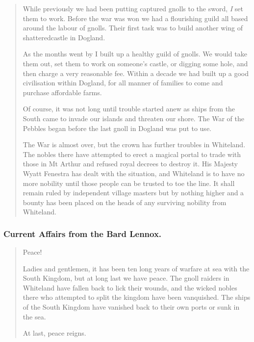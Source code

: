 \begin{multicols}{2}
\begin{quotation}
	While previously we had been putting captured gnolls to the sword, \emph{I} set them to work.
	Before the war was won we had a flourishing guild all based around the labour of gnolls.
	Their first task was to build another wing of \gls{shatteredcastle} in Dogland.

	As the months went by I built up a healthy guild of gnolls.
	We would take them out, set them to work on someone's castle, or digging some hole, and then charge a very reasonable fee.
	Within a decade we had built up a good civilisation within Dogland, for all manner of families to come and purchase affordable farms.

	Of course, it was not long until trouble started anew as ships from the South came to invade our islands and threaten our shore.
	The War of the Pebbles began before the last gnoll in Dogland was put to use.

	The War is almost over, but the crown has further troubles in Whiteland.
	The nobles there have attempted to erect a magical portal to trade with those in Mt Arthur and refused royal decrees to destroy it.
	His Majesty Wyatt Fenestra has dealt with the situation, and Whiteland is to have no more nobility until those people can be trusted to toe the line.
	It shall remain ruled by independent village masters but by nothing higher and a bounty has been placed on the heads of any surviving nobility from Whiteland.

\end{quotation}

\subsubsection{Current Affairs from the Bard Lennox.}

\begin{quotation}

	Peace!

	Ladies and gentlemen, it has been ten long years of warfare at sea with the South Kingdom, but at long last we have peace.
	The gnoll raiders in Whiteland have fallen back to lick their wounds, and the wicked nobles there who attempted to split the kingdom have been vanquished.
	The ships of the South Kingdom have vanished back to their own ports or sunk in the sea.

	At last, peace reigns.

\end{quotation}

\begin{quotation}


\end{quotation}
\end{multicols}
